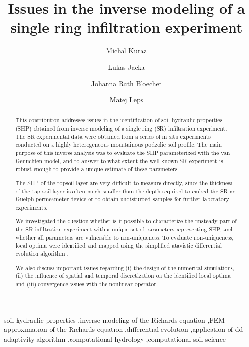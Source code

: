 \documentclass[review]{elsarticle}
\begin{document}
\begin{frontmatter}

\title{Issues in the inverse modeling of a single ring infiltration experiment}

\author[autor1]{Michal Kuraz}

\author[autor1]{Lukas Jacka}

\author[autor1]{Johanna Ruth Bloecher}

\author[autor2]{Matej Leps}



\address[autor1]{Czech University of Life Sciences Prague, Faculty of Environmental Sciences, Department of Water Resources and Environmental Modeling}

\address[autor2]{Czech Technical University in Prague, Faculty of Civil Engineering, Department of Mechanics}

\begin{abstract}
This contribution addresses issues in the identification of soil hydraulic properties (SHP) obtained from inverse modeling of a single ring (SR) infiltration experiment. 
The SR experimental  data  were obtained from a series of in situ experiments conducted on a highly heterogeneous mountainous podzolic soil profile. 
The main purpose of this inverse analysis was to evaluate the SHP parameterized with the van Genuchten model, and to answer to what extent the well-known SR experiment is robust enough to provide a unique estimate of these parameters.

The SHP of the topsoil layer are very difficult to measure directly, since the thickness of the top soil layer is often much smaller than the depth required to embed the SR or Guelph permeameter device or to obtain undisturbed samples for further laboratory experiments.


We investigated the question whether is it possible to characterize the unsteady part of the SR infiltration experiment with a unique set of parameters representing  SHP, and whether all parameters are vulnerable to non-uniqueness. To evaluate non-uniqueness, local optima were identified and mapped using the simplified atavistic differential evolution algorithm \citep{Hrstka,grade}.   

We also discuss important issues regarding (i) the design of the numerical simulations, (ii) the influence of spatial and temporal discretization on the identified local optima and (iii) convergence issues with the nonlinear operator. 
\end{abstract}

\begin{keyword}
soil hydraulic properties \sep inverse modeling of the Richards equation \sep FEM approximation of the Richards equation \sep differential evolution \sep application of dd-adaptivity algorithm \sep computational hydrology \sep computational soil science


\end{keyword}

\end{frontmatter}
\end{document}
